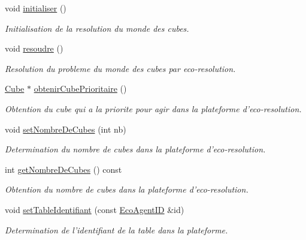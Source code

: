 \begin{CompactItemize}
\item 
void \hyperlink{classPlateformeMondeDesCubes_67160be6f5ecd0b8f3fffeb1a7bd81ba}{initialiser} ()
\begin{CompactList}\small\item\em Initialisation de la resolution du monde des cubes. \item\end{CompactList}\item 
void \hyperlink{classPlateformeMondeDesCubes_c7be18c8d02e2743e884545828cfabed}{resoudre} ()
\begin{CompactList}\small\item\em Resolution du probleme du monde des cubes par eco-resolution. \item\end{CompactList}\item 
\hyperlink{classCube}{Cube} $\ast$ \hyperlink{classPlateformeMondeDesCubes_605987b8e7760eacc2db63d56a58daa1}{obtenirCubePrioritaire} ()
\begin{CompactList}\small\item\em Obtention du cube qui a la priorite pour agir dans la plateforme d'eco-resolution. \item\end{CompactList}\item 
void \hyperlink{classPlateformeMondeDesCubes_e519331088db520a76d1ead67a382c48}{setNombreDeCubes} (int nb)
\begin{CompactList}\small\item\em Determination du nombre de cubes dans la plateforme d'eco-resolution. \item\end{CompactList}\item 
int \hyperlink{classPlateformeMondeDesCubes_a341731830c30c695d5ef80c90377165}{getNombreDeCubes} () const 
\begin{CompactList}\small\item\em Obtention du nombre de cubes dans la plateforme d'eco-resolution. \item\end{CompactList}\item 
void \hyperlink{classPlateformeMondeDesCubes_cf6eccc70251d89c4d12c921f44934af}{setTableIdentifiant} (const \hyperlink{classEcoAgentID}{EcoAgentID} \&id)
\begin{CompactList}\small\item\em Determination de l'identifiant de la table dans la plateforme. \item\end{CompactList}\item 

\end{CompactItemize}
